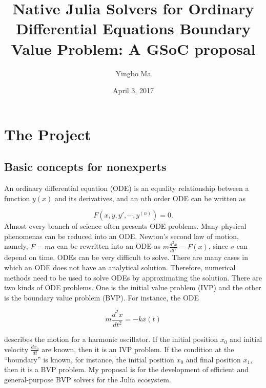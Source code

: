 \documentclass[a4paper,11pt,onecolumn]{article}
\author{Yingbo Ma}
\date{April 3, 2017}
\title{Native Julia Solvers for Ordinary Differential Equations Boundary Value Problem: A GSoC proposal}
\begin{document}
\maketitle
\tableofcontents



\section{The Project} %
\label{sec:the_project}

\subsection{Basic concepts for nonexperts} %
\label{sub:basic_concepts_for_nonexperts}
An ordinary differential equation (ODE) is an equality relationship between a function $y(x)$
and its derivatives, and an $n$th order ODE can be written as

\[F(x, y, y', \cdots, y^{(n)}) = 0.\]
Almost every branch of science often presents ODE problems. Many physical phenomenas can be reduced
into an ODE. Newton's second law of motion, namely, $F=ma$ can be rewritten into an ODE as $m\frac{
d^2x}{dt^2}=F(x)$, since $a$ can depend on time. ODEs can be very difficult to solve. There are
many cases in which an ODE does not have an analytical solution. Therefore, numerical methods need
to be used to solve ODEs by approximating the solution. There are two kinds of ODE problems. One 
is the initial value problem (IVP) and the other is the boundary value problem (BVP). For instance, the ODE

\[m\frac{d^2x}{dt^2} = -kx(t)\]

describes the motion for a harmonic oscillator. If the initial position $x_0$ and initial velocity
$\frac{dx_0}{dt}$ are known, then it is an IVP problem. If the condition at the ``boundary'' is 
known, for instance, the initial position $x_0$ and final position $x_1$, then it is a BVP problem. My
proposal is for the development of efficient and general-purpose BVP solvers for the Julia
ecosystem.
\end{document}
